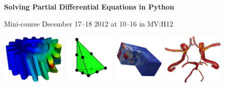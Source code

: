 \documentclass{article}
\begin{document}
\null
\vspace{-2.5cm}

\begin{center}
  \bf
  \LARGE
  Solving Partial Differential Equations in Python

  \smallskip

  \Large
  Mini-course December 17--18 2012 at 10--16 in MV:H12
\end{center}

\smallskip

\begin{center}
  \includegraphics[height=2.5cm]{pdf/elasticity.pdf}
  \includegraphics[height=2.5cm]{png/CG2_3d.png}
  \includegraphics[height=2.5cm]{png/poisson_picture.png}
  \includegraphics[height=2.5cm]{png/circle_of_willis_simulation.png}
\end{center}
\end{document}
